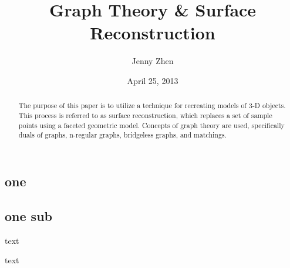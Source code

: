 \documentclass[12pt]{article}
\begin{document}
\title{Graph Theory \& Surface Reconstruction}
\author{Jenny Zhen}
\date{April 25, 2013}
\maketitle

\begin{abstract}The purpose of this paper is to utilize a technique for recreating models of 3-D objects. This process is referred to as surface reconstruction, which replaces a set of sample points using a faceted geometric model. Concepts of graph theory are used, specifically duals of graphs, n-regular graphs, bridgeless graphs, and matchings.
\end{abstract}


\begin{flushleft}
\section*{one}

\subsection*{one sub}
text

\medskip
text

\end{flushleft}
\end{document}
